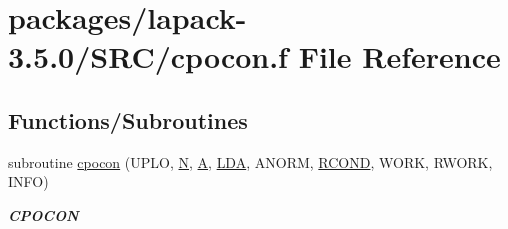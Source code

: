 \hypertarget{cpocon_8f}{}\section{packages/lapack-\/3.5.0/\+S\+R\+C/cpocon.f File Reference}
\label{cpocon_8f}
\subsection*{Functions/\+Subroutines}
\begin{DoxyCompactItemize}
\item 
subroutine \hyperlink{group__complexPOcomputational_ga2ddc05543f7ed596609cdce0478ca8a3}{cpocon} (U\+P\+L\+O, \hyperlink{polmisc_8c_a0240ac851181b84ac374872dc5434ee4}{N}, \hyperlink{classA}{A}, \hyperlink{example__user_8c_ae946da542ce0db94dced19b2ecefd1aa}{L\+D\+A}, A\+N\+O\+R\+M, \hyperlink{superlu__enum__consts_8h_af00a42ecad444bbda75cde1b64bd7e72a9b5c151728d8512307565994c89919d5}{R\+C\+O\+N\+D}, W\+O\+R\+K, R\+W\+O\+R\+K, I\+N\+F\+O)
\begin{DoxyCompactList}\small\item\em {\bfseries C\+P\+O\+C\+O\+N} \end{DoxyCompactList}\end{DoxyCompactItemize}
